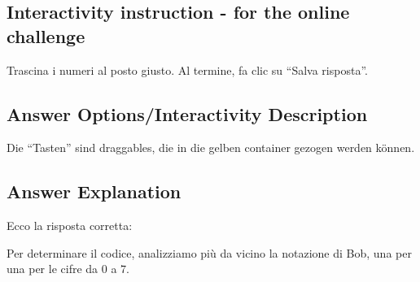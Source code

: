 \documentclass[a4paper,11pt]{report}
\newcommand{\taskGraphicsFolder}{..}
\begin{document}
\subsection*{Interactivity instruction - for the online challenge}

Trascina i numeri al posto giusto. Al termine, fa clic su \enquote{Salva risposta}.

\begingroup
\renewcommand{\arraystretch}{1.5}
\subsection*{Answer Options/Interactivity Description}

Die \enquote{Tasten} sind draggables, die in die gelben container gezogen werden können.

\endgroup

\subsection*{Answer Explanation}

Ecco la risposta corretta:

{\centering%
\par}

Per determinare il codice, analizziamo più da vicino la notazione di Bob, una per una per le cifre da $0$ a $7$.
\end{document}
